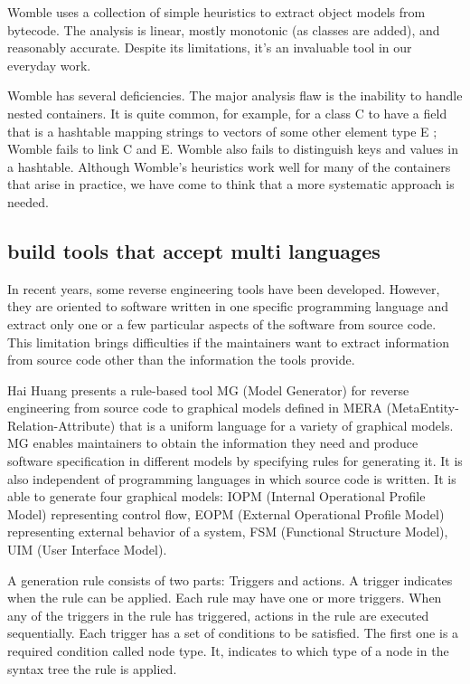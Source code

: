 \documentclass[acmsmall]{acmart}
\begin{document}
 Womble uses a collection of simple heuristics to extract
object models from bytecode. The analysis is linear, mostly
monotonic (as classes are added), and reasonably accurate.
Despite its limitations,  it's an invaluable tool in our
everyday work.


Womble has several deficiencies. The major analysis flaw
is the inability to handle nested containers. It is quite
common, for example, for a class
C to have a field that is a
hashtable mapping strings to vectors of some other element
type E ; Womble fails to link C and E.
Womble also fails to
distinguish keys and values in a hashtable. Although
Womble's heuristics work well for many of the containers
that arise in practice, we have come to think that a more
systematic approach is needed.

\subsection{build tools that accept multi languages}


In recent years, some reverse engineering tools have been developed. However, they are oriented to software written in one specific programming language and extract only one or a few particular aspects of the software from source code. This limitation brings difficulties if the maintainers want to extract information from source code other than the information the tools provide. 

Hai Huang presents a rule-based tool MG (Model Generator)\cite{1992A} for reverse engineering from source code to graphical models defined in MERA (MetaEntity-Relation-Attribute) that is a uniform language for a variety of graphical models. MG enables maintainers to obtain the information they need and produce software specification in different models by specifying rules for generating it. It is also independent of programming languages in which source code is written. It is able to generate four graphical models: IOPM (Internal Operational Profile Model) representing control flow, EOPM (External Operational Profile Model) representing external behavior of a system, FSM (Functional Structure Model), UIM (User Interface Model).

A generation rule consists of two parts: Triggers and actions. A trigger indicates when the rule can be applied. Each rule may have one or more triggers. When any of the triggers in the rule has triggered, actions in the rule are executed sequentially. Each trigger has a set of conditions to be satisfied. The first one is a required condition called node type. It, indicates to which type of a node in the syntax tree the rule is applied.
\end{document}
